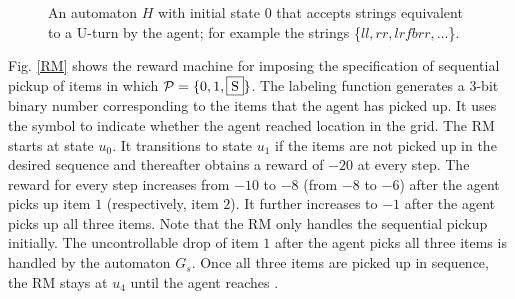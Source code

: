 \documentclass[letterpaper, 10 pt, conference]{ieeeconf}
\begin{document}
\begin{figure}[htbp]
    \centering
    \caption{An automaton $H$ with initial state $0$ that accepts strings equivalent to a U-turn by the agent; for example the strings \{$ll, rr, lrfbrr, \hdots$\}.}
    \label{H1}
\end{figure}
Fig. \ref{RM} shows the reward machine for imposing the specification of sequential pickup of items in which $\mathcal{P} = \{0, 1, \fbox{S}\}$. The labeling function generates a 3-bit binary number corresponding to the items that the agent has picked up. It uses the symbol  to indicate whether the agent reached location  in the grid. The RM starts at state $u_0$. It transitions to state $u_1$ if the items are not picked up in the desired sequence and thereafter obtains a reward of $-20$ at every step. The reward for every step increases from $-10$ to $-8$ (from $-8$ to $-6$) after the agent picks up item $1$ (respectively, item $2$). It further increases to $-1$ after the agent picks up all three items. Note that the RM only handles the sequential pickup initially. The uncontrollable drop of item $1$ after the agent picks all three items is handled by the automaton $G_s$. Once all three items are picked up in sequence, the RM stays at $u_4$ until the agent reaches .\\
\end{document}
